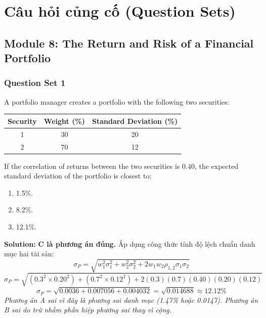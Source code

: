 \chapter{Câu hỏi củng cố (Question Sets)}
\label{chap:Question Sets}

\section*{Module 8: The Return and Risk of a Financial Portfolio}

\subsection{Question Set 1}
\label{subsec:app_Question Set 1}

\begin{tcolorbox}[
	colback=gray!5!white,
	colframe=black!15!white,
	boxrule=0.5pt,
	arc=3pt,
	title=\textbf{Question 1},
	coltitle=black,
	colbacktitle=black!5!white,
	before skip=6pt,
	after skip=6pt,
	breakable
]
A portfolio manager creates a portfolio with the following two securities:
\begin{center}
\begin{tabular}{c  c  c}
	\toprule
	\textbf{Security} & \textbf{Weight (\%)} & \textbf{Standard Deviation (\%)} \\
	\midrule
	1 & 30 & 20 \\
	2 & 70 & 12 \\
	\bottomrule
\end{tabular}
\end{center}
If the correlation of returns between the two securities is $0.40$, the expected standard deviation of the portfolio is closest to:
\begin{enumerate}[label=\Alph*.]
	\item 1.5\%.
	\item 8.2\%.
	\item 12.1\%.
\end{enumerate}

\textbf{Solution:}
\textbf{C là phương án đúng.} Áp dụng công thức tính độ lệch chuẩn danh mục hai tài sản:
\[
\sigma_P = \sqrt{w_1^2 \sigma_1^2 + w_2^2 \sigma_2^2 + 2 w_1 w_2 \rho_{1,2} \sigma_1 \sigma_2}
\]
\[
\sigma_P = \sqrt{(0.3^2 \times 0.20^2) + (0.7^2 \times 0.12^2) + 2(0.3)(0.7)(0.40)(0.20)(0.12)}
\]
\[
\sigma_P = \sqrt{0.0036 + 0.007056 + 0.004032} = \sqrt{0.014688} \approx 12.12\%
\]
\textit{Phương án A sai vì đây là phương sai danh mục (1.47\% hoặc 0.0147). Phương án B sai do trừ nhầm phần hiệp phương sai thay vì cộng.}
\end{tcolorbox}

